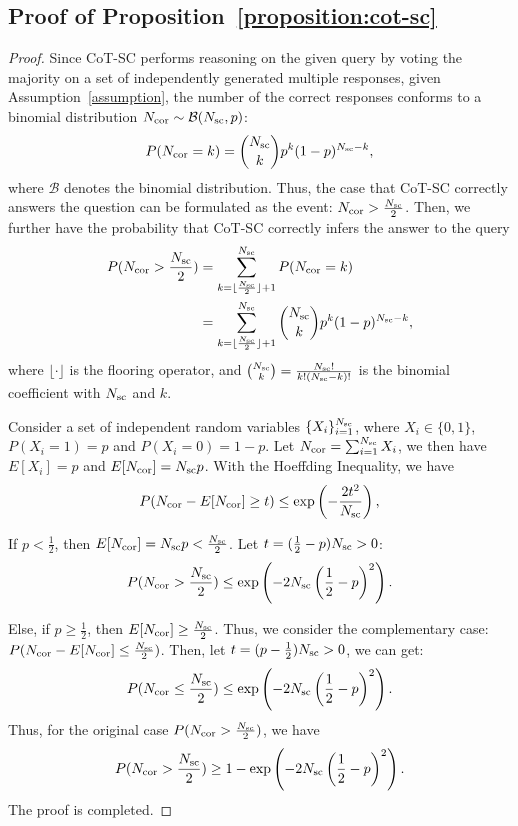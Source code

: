 \documentclass{article} %
\theoremstyle{plain}
\begin{document}
\subsection{Proof of Proposition~\ref{proposition:cot-sc}}
\begin{proof}
    Since CoT-SC performs reasoning on the given query by voting the majority on a set of independently generated multiple responses, given Assumption~\ref{assumption}, the number of the correct responses conforms to a binomial distribution $N_{\rm cor}\sim\mathcal{B}(N_{\rm sc}, p)$:
    \[P(N_{\rm cor}=k)=\binom{N_{\rm sc}}{k}p^{k}(1-p)^{N_{\rm sc}-k},\]
    where $\mathcal{B}$ denotes the binomial distribution. 
    Thus, the case that CoT-SC correctly answers the question can be formulated as the event: $ N_{\rm cor}>\frac{N_{\rm sc}}{2}$. Then, we further have the probability that CoT-SC correctly infers the answer to the query
    \[
    \begin{aligned}
        P(N_{\rm cor}>\frac{N_{\rm sc}}{2})&=\sum_{k=\lfloor \frac{N_{\rm sc}}{2}\rfloor+1}^{N_{\rm sc}}P(N_{\rm cor}=k)\\
        &=\sum_{k=\lfloor \frac{N_{\rm sc}}{2}\rfloor+1}^{N_{\rm sc}}\binom{N_{\rm sc}}{k}p^{k}(1-p)^{N_{\rm sc}-k},
    \end{aligned}
    \]
    where $\lfloor\cdot\rfloor$ is the flooring operator, and $\binom{N_{\rm sc}}{k}=\frac{N_{\rm sc}!}{k!(N_{\rm sc}-k)!}$ is the binomial coefficient with $N_{\rm sc}$ and $k$.

    Consider a set of independent random variables $\{X_i\}_{i=1}^{N_{\rm sc}}$, where $X_i\in\{0, 1\}$, $P(X_i=1)=p$ and $P(X_i=0)=1-p$. Let $N_{\rm cor}=\sum_{i=1}^{N_{\rm sc}}X_i$, we then have $E[X_i]=p$ and $E[N_{\rm cor}]=N_{\rm sc}p$. With the Hoeffding Inequality, we have
    \[
        P(N_{\rm cor}-E[N_{\rm cor}]\ge t)\leq\exp\left(-\frac{2t^2}{N_{\rm sc}}\right),
    \]
    

    If $p<\frac{1}{2}$, then $E[N_{\rm cor}]=N_{\rm sc}p<\frac{N_{\rm sc}}{2}$. Let $t=(\frac{1}{2}-p)N_{\rm sc}>0$:
    \[
        P(N_{\rm cor}>\frac{N_{\rm sc}}{2})\leq\exp\left(-2N_{\rm sc}\left(\frac{1}{2}-p\right)^2\right).
    \]
    
    Else, if $p\ge\frac{1}{2}$, then $E[N_{\rm cor}]\ge\frac{N_{\rm sc}}{2}$. Thus, we consider the complementary case: $P(N_{\rm cor}-E[N_{\rm cor}]\leq\frac{N_{\rm sc}}{2})$. Then, let $t=(p-\frac{1}{2})N_{\rm sc}>0$, we can get:
    \[
        P(N_{\rm cor}\leq\frac{N_{\rm sc}}{2})\leq\exp\left(-2N_{\rm sc}\left(\frac{1}{2}-p\right)^2\right).
    \]
    Thus, for the original case $P(N_{\rm cor}>\frac{N_{\rm sc}}{2})$, we have
    \[
        P(N_{\rm cor}>\frac{N_{\rm sc}}{2})\geq1-\exp\left(-2N_{\rm sc}\left(\frac{1}{2}-p\right)^2\right).
    \]
    The proof is completed.
\end{proof}
\end{document}
